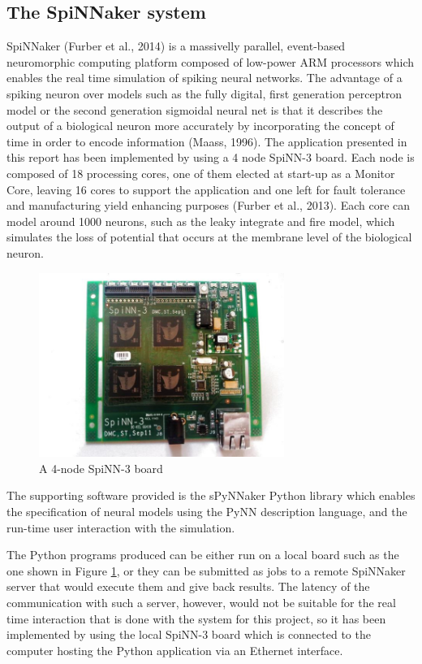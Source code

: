 \documentclass[10pt]{article}
\begin{document}
    \subsection{The SpiNNaker system}

    SpiNNaker (Furber et al., 2014) is a massivelly parallel, event-based neuromorphic computing platform composed of low-power ARM processors which enables the real time simulation of spiking neural networks. The advantage of a spiking neuron over models such as the fully digital, first generation perceptron model or the second generation sigmoidal neural net is that it describes the output of a biological neuron more accurately by incorporating the concept of time in order to encode information (Maass, 1996). The application presented in this report has been implemented by using a 4 node SpiNN-3 board. Each node is composed of 18 processing cores, one of them elected at start-up as a Monitor Core, leaving 16 cores to support the application and one left for fault tolerance and manufacturing yield enhancing purposes (Furber et al., 2013). Each core can model around 1000 neurons, such as the leaky integrate and fire model, which simulates the loss of potential that occurs at the membrane level of the biological neuron.

    \begin{figure}[ht!]
    \centering
    \includegraphics[width=80mm]{./SpiNN-3.jpg}
    \caption{A 4-node SpiNN-3 board \label{overflow}}
    \label{fig:spinnBoard}
    \end{figure}

    \setcounter{figure}{3}

    The supporting software provided is the sPyNNaker Python library which enables the specification of neural models using the PyNN description language, and the run-time user interaction with the simulation.

    The Python programs produced can be either run on a local board such as the one shown in Figure \ref{fig:spinnBoard}, or they can be submitted as jobs to a remote SpiNNaker server that would execute them and give back results. The latency of the communication with such a server, however, would not be suitable for the real time interaction that is done with the system for this project, so it has been implemented by using the local SpiNN-3 board which is connected to the computer hosting the Python application via an Ethernet interface.
\end{document}
